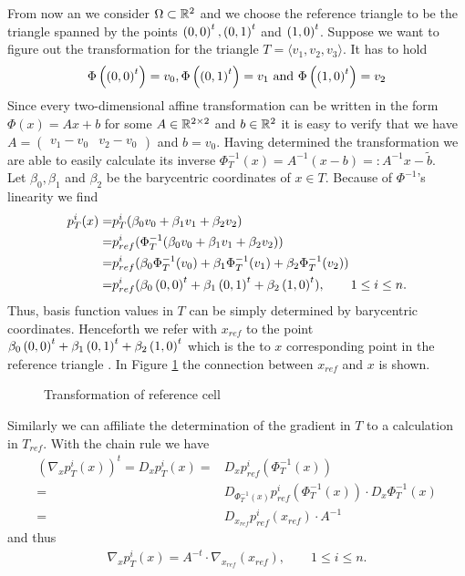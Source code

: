 \begin{example}\label{ex: base cell trafo}
From now an we consider $\Omega \subset \mathbb{R}^2$ and we choose the reference triangle to be the triangle spanned by the points $\left( 0, 0\right)^t, \left( 0, 1\right)^t$ and $\left( 1, 0\right)^t$.
Suppose we want to figure out the transformation for the triangle $T = \langle v_1,v_2,v_3 \rangle$.
It has to hold
\[
\Phi\left(\left( 0, 0\right)^t\right) = v_0, \Phi\left(\left( 0, 1\right)^t\right) = v_1 \textnormal{ and } \Phi\left(\left( 1, 0\right)^t\right) = v_2
\]
Since every two-dimensional affine transformation can be written in the form $\Phi(x) = Ax+b$ for some $A \in \mathbb{R}^{2 \times 2}$ and $b \in \mathbb{R}^2$ it is easy to verify that we have $A = \begin{pmatrix} v_1-v_0 & v_2-v_0\end{pmatrix}$ and $b = v_0$.
Having determined the transformation we are able to easily calculate its inverse $\Phi_T^{-1}(x) = A^{-1} (x-b) =: A^{-1} x- \tilde b$. \\
Let $\beta_0, \beta_1$ and $\beta_2$ be the barycentric coordinates of $x \in T$. Because of $\Phi^{-1}$'s linearity we find
\begin{align*}
	p^i_T(x) =& p_T^i( \beta_0 v_0 +\beta_1 v_1 + \beta_2 v_2  ) \\
	=& p^i_{ref}(\Phi_T^{-1}(\beta_0 v_0 +\beta_1 v_1 + \beta_2 v_2)) \\
	=& p^i_{ref}(\beta_0 \Phi_T^{-1}(v_0) +\beta_1 \Phi_T^{-1}(v_1) + \beta_2 \Phi_T^{-1}(v_2)) \\
		=& p^i_{ref}(\beta_0 \left( 0, 0\right)^t +\beta_1 \left( 0, 1\right)^t + \beta_2 \left( 1, 0\right)^t ), \qquad 1 \leq i \leq n.
\end{align*}
Thus, basis function values in $T$ can be simply determined by barycentric coordinates. Henceforth we refer with $x_{ref}$  to the point $\beta_0 \left( 0, 0\right)^t +\beta_1 \left( 0, 1\right)^t + \beta_2 \left( 1, 0\right)^t$ which is the to $x$ corresponding point in the reference triangle . In Figure \ref{fig: transformation} the connection between $x_{ref}$ and $x$ is shown.

\begin{figure}[!h]
	
	\caption{Transformation of reference cell}
	 \label{fig: transformation}
\end{figure}

Similarly we can affiliate the determination of the gradient in $T$ to a calculation in $T_{ref}$. With the chain rule we have
\begin{align*}
	\left(\nabla_x p_T^i(x)\right)^t = D_x p_T^i(x) =& D_x p^i_{ref}(\Phi_T^{-1}(x)) \\
	  =& D_{\Phi_T^{-1}(x)}p^i_{ref}(\Phi_T^{-1}(x)) \cdot D_x  \Phi_T^{-1}(x) \\
	  =& D_{x_{ref}}p^i_{ref}(x_{ref}) \cdot  A^{-1}
\end{align*}
and thus
\begin{align}
	\nabla_x p_T^i(x) = A^{-t} \cdot \nabla_{x_{ref}}(x_{ref}), \qquad 1 \leq i \leq n. \label{eq: ref gradient}
\end{align}


\end{example}
